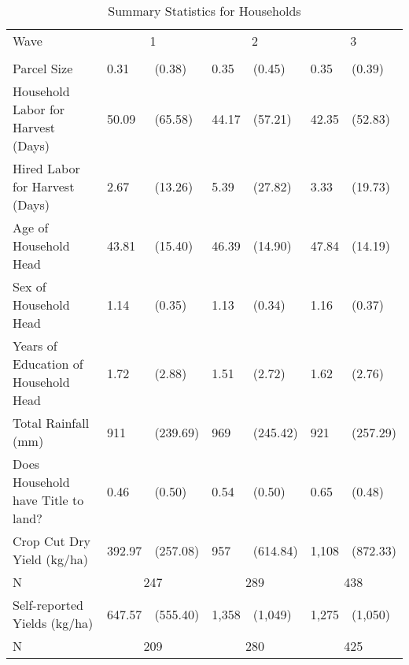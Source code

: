 \begin{table}
\caption{Summary Statistics for Households}
\label{tbl:summary}
\begin{tabular}{lllllll}
\toprule
Wave & \multicolumn{2}{c}{1} & \multicolumn{2}{c}{2} & \multicolumn{2}{c}{3} \\
 &  &  &  &  &  &  \\
\midrule
Parcel Size & 0.31 & (0.38) & 0.35 & (0.45) & 0.35 & (0.39) \\
Household Labor for Harvest (Days) & 50.09 & (65.58) & 44.17 & (57.21) & 42.35 & (52.83) \\
Hired Labor for Harvest (Days) & 2.67 & (13.26) & 5.39 & (27.82) & 3.33 & (19.73) \\
Age of Household Head & 43.81 & (15.40) & 46.39 & (14.90) & 47.84 & (14.19) \\
Sex of Household Head & 1.14 & (0.35) & 1.13 & (0.34) & 1.16 & (0.37) \\
Years of Education of Household Head & 1.72 & (2.88) & 1.51 & (2.72) & 1.62 & (2.76) \\
Total Rainfall (mm) & 911 & (239.69) & 969 & (245.42) & 921 & (257.29) \\
Does Household have Title to land? & 0.46 & (0.50) & 0.54 & (0.50) & 0.65 & (0.48) \\
Crop Cut Dry Yield (kg/ha) & 392.97 & (257.08) & 957 & (614.84) & 1,108 & (872.33) \\
\midrule
N & \multicolumn{2}{c}{247}&\multicolumn{2}{c}{289}&\multicolumn{2}{c}{438}\\
\midrule
Self-reported Yields (kg/ha) & 647.57 & (555.40) & 1,358 & (1,049) & 1,275 & (1,050) \\
\midrule
N & \multicolumn{2}{c}{209}&\multicolumn{2}{c}{280}&\multicolumn{2}{c}{425}\\
\bottomrule
\end{tabular}
\end{table}
